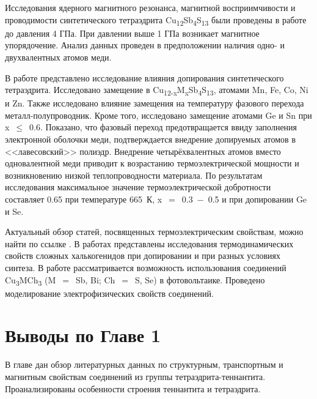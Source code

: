 Исследования ядерного магнитного резонанса, магнитной восприимчивости и проводимости синтетического тетраэдрита Cu\textsubscript{12}Sb\textsubscript{4}S\textsubscript{13} были проведены в работе \cite{Kitagawa2015} до давления 4 ГПа. При давлении выше 1 ГПа возникает магнитное упорядочение. Анализ данных проведен в предположении наличия одно- и двухвалентных атомов меди.


В работе \cite{Kosaka2017} представлено исследование влияния допирования синтетического тетраэдрита. Исследовано замещение в Cu\textsubscript{12-x}M\textsubscript{x}Sb\textsubscript{4}S\textsubscript{13}, атомами Mn, Fe, Co, Ni и Zn. Также исследовано влияние замещения на температуру фазового перехода металл-полупроводник. Кроме того, исследовано замещение атомами Ge и Sn при x~$\leq $~0.6. Показано, что фазовый переход предотвращается ввиду заполнения электронной оболочки меди, подтверждается внедрение допируемых атомов в <<лавесовский>> полиэдр. Внедрение четырёхвалентных атомов вместо одновалентной меди приводит к возрастанию термоэлектрической мощности и возникновению низкой теплопроводности материала. По результатам исследования максимальное значение термоэлектрической добротности составляет 0.65 при температуре 665~К, x~$=$~0.3~$-$~0.5 и при допировании Ge и Se.

Актуальный обзор статей, посвященных термоэлектрическим свойствам,  можно найти по ссылке \cite{Powella}. В работах \cite{ther_10.1007/s11664-016-4893-7,ther_10.1016/j.intermet.2016.08.003,ther_10.1016/j.jallcom.2017.01.187,ther_10.1039/C7RA02564E,ther_10.1039/C7TC00762K,ther_AENM:AENM201200650,ther_C5TC01636C,ther_C6DT00564K,ther_doi:10.1021/acs.chemmater.7b00891,ther_doi:10.1021/acs.inorgchem.7b02128,ther_doi:10.1021/acs.jpcc.7b02068,ther_doi.org/10.1016/j.jssc.2017.01.003,ther_GONCALVES2016209,ther_HARISH2016323,ther_JACE:JACE13838,ther_lu2014effect}  представлены исследования термодинамических свойств сложных халькогенидов при допировании и при разных условиях синтеза.
В работе \cite{Kehoe_2013} рассматривается возможность использования соединений Cu\textsubscript{3}MCh\textsubscript{3} (M~$=$~Sb, Bi; Ch~$=$~S, Se) в фотовольтаике. Проведено моделирование электрофизических свойств соединений.
\newpage

\section{Выводы по Главе 1} \label{sect1_4}

В главе дан обзор литературных данных по структурным, транспортным и магнитным свойствам соединений из группы тетраэдрита-теннантита. Проанализированы особенности строения теннантита и тетраэдрита.

